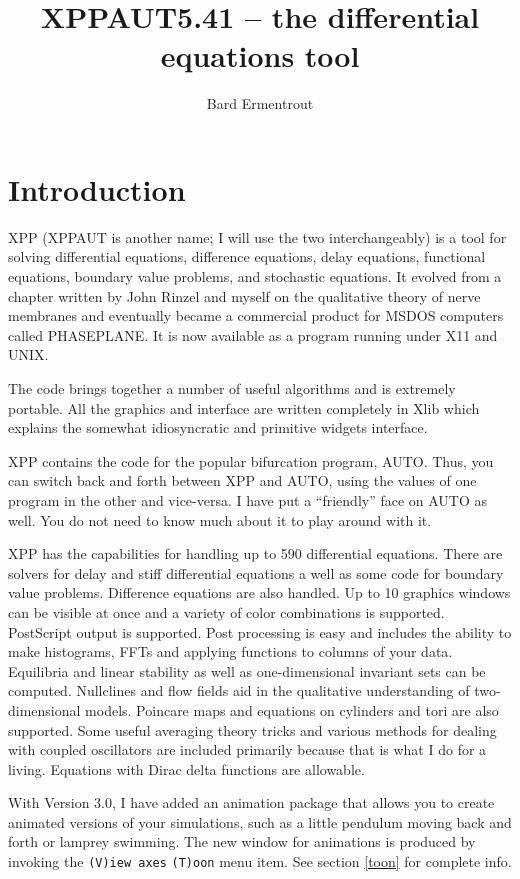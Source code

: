 \documentclass{article}
\title{XPPAUT5.41 -- the differential equations tool}
\author{Bard Ermentrout}
\begin{document}
\maketitle
\tableofcontents
\newpage
\section{Introduction} XPP (XPPAUT is another name; I will use the two
interchangeably)
  is a tool for solving differential
equations,
 difference 
equations, delay equations, functional equations, boundary value
problems, and stochastic equations. 
 It evolved 
from a chapter written by John Rinzel and myself on the qualitative
 theory of nerve membranes and eventually became a commercial product
 for MSDOS computers called PHASEPLANE.  It is now available as a
program running
 under
 X11 and UNIX.  

 The code 
brings together a number of useful algorithms and is extremely portable. 
 All the graphics and interface are written completely in Xlib which explains 
the somewhat idiosyncratic and primitive widgets interface.  

XPP contains the code for the popular bifurcation
program, AUTO.  Thus, you can switch back and forth between XPP and
AUTO, using the values of one program in the other and vice-versa.  I
have put a ``friendly'' face on AUTO as well.  You do not need to know
much about it to play around with it.

XPP has the capabilities for handling up to 590 differential equations. 
 There are solvers for delay and stiff differential equations a well as
 some code for boundary value problems.  Difference equations are also
 handled.  Up to 10 graphics windows can be visible at once and a variety
 of color combinations is supported.  PostScript output
 is supported.  Post processing is easy and includes the ability to make
 histograms, FFTs and applying functions to columns of your data.
Equilibria
 and linear stability as well as one-dimensional invariant sets can be
 computed.  Nullclines and flow fields aid in the qualitative understanding
 of two-dimensional models.  Poincare maps and equations on cylinders and
 tori are also supported.  Some useful averaging theory tricks and various
 methods for dealing with coupled oscillators are included primarily because
 that is what I do for a living. Equations with Dirac delta functions
are allowable.

With Version 3.0, I have added an animation package that allows you to
create animated versions of your simulations, such as a little
pendulum moving back and forth or lamprey swimming. The new window for
animations is produced by invoking the {\tt (V)iew axes} {\tt (T)oon}
menu item.  See section \ref{toon} for complete info.
\end{document}
